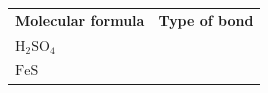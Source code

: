 \begin{enumerate}[noitemsep, label=\textbf{\arabic*}. ]
{{        \begin{center}
      
      \label{m38694*id143418}
      
    \noindent
      \tablelasttail{}
      \begin{xtabular}[t]{|l|l|}\hline
    
    
        \textbf{Molecular formula} &
    
    
        \textbf{Type of bond}%
     \tabularnewline{}
    
    
        \begin{math}\mathrm{H}{}_{2}\mathrm{SO}{}_{4}\end{math} &
    
    
     \tabularnewline{}
    
    
        \begin{math}\mathrm{FeS}\end{math} &
    
    

\end{xtabular}
\end{center}}}
\end{enumerate}
